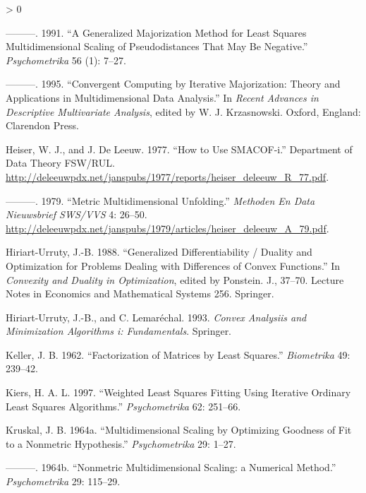 \documentclass[
  12pt,
]{book}
\newlength{\cslhangindent}
\newenvironment{CSLReferences}[2] %
 {%
  \setlength{\parindent}{0pt}
  \ifodd #1 \everypar{\setlength{\hangindent}{\cslhangindent}}\ignorespaces\fi
  \ifnum #2 > 0
  \setlength{\parskip}{#2\baselineskip}
  \fi
 }%
 {}
\theoremstyle{definition}
\theoremstyle{definition}
\theoremstyle{definition}
\theoremstyle{definition}
\theoremstyle{remark}
\begin{document}
\begin{CSLReferences}{1}{0}
\leavevmode\hypertarget{ref-heiser_91}{}%
---------. 1991. {``A Generalized Majorization Method for Least Squares Multidimensional Scaling of Pseudodistances That May Be Negative.''} \emph{Psychometrika} 56 (1): 7--27.

\leavevmode\hypertarget{ref-heiser_95}{}%
---------. 1995. {``{Convergent Computing by Iterative Majorization: Theory and Applications in Multidimensional Data Analysis}.''} In \emph{Recent Advances in Descriptive Multivariate Analysis}, edited by W. J. Krzasnowski. Oxford, England: Clarendon Press.

\leavevmode\hypertarget{ref-heiser_deleeuw_R_77}{}%
Heiser, W. J., and J. De Leeuw. 1977. {``How to Use SMACOF-i.''} Department of Data Theory FSW/RUL. \url{http://deleeuwpdx.net/janspubs/1977/reports/heiser_deleeuw_R_77.pdf}.

\leavevmode\hypertarget{ref-heiser_deleeuw_A_79}{}%
---------. 1979. {``Metric Multidimensional Unfolding.''} \emph{Methoden En Data Nieuwsbrief SWS/VVS} 4: 26--50. \url{http://deleeuwpdx.net/janspubs/1979/articles/heiser_deleeuw_A_79.pdf}.

\leavevmode\hypertarget{ref-hiriart-urruty_88}{}%
Hiriart-Urruty, J.-B. 1988. {``Generalized Differentiability / Duality and Optimization for Problems Dealing with Differences of Convex Functions.''} In \emph{Convexity and Duality in Optimization}, edited by Ponstein. J., 37--70. Lecture Notes in Economics and Mathematical Systems 256. Springer.

\leavevmode\hypertarget{ref-hiriart-urruty_lemarechal_93a}{}%
Hiriart-Urruty, J.-B., and C. Lemaréchal. 1993. \emph{Convex Analysiis and Minimization Algorithms i: Fundamentals}. Springer.

\leavevmode\hypertarget{ref-keller_62}{}%
Keller, J. B. 1962. {``{Factorization of Matrices by Least Squares}.''} \emph{Biometrika} 49: 239--42.

\leavevmode\hypertarget{ref-kiers_97}{}%
Kiers, H. A. L. 1997. {``{Weighted Least Squares Fitting Using Iterative Ordinary Least Squares Algorithms}.''} \emph{Psychometrika} 62: 251--66.

\leavevmode\hypertarget{ref-kruskal_64a}{}%
Kruskal, J. B. 1964a. {``{Multidimensional Scaling by Optimizing Goodness of Fit to a Nonmetric Hypothesis}.''} \emph{Psychometrika} 29: 1--27.

\leavevmode\hypertarget{ref-kruskal_64b}{}%
---------. 1964b. {``{Nonmetric Multidimensional Scaling: a Numerical Method}.''} \emph{Psychometrika} 29: 115--29.


\end{CSLReferences}
\end{document}
